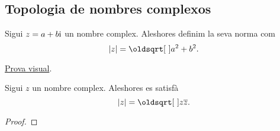 \documentclass[../Apunts.tex]{subfiles}
\begin{document}
	\subsection{Topologia de nombres complexos}
	\begin{definition}
		\label{def:norma d'un nombre complex}
		Sigui \(z=a+b\mathrm{i}\) un nombre complex. Aleshores definim la seva norma com
		\[\norma{z}=\sqrt{a^{2}+b^{2}}.\]
	\end{definition}
	\begin{proposition}
		\href{http://chistemat.es/wp-content/uploads/2013/11/contra-la-desigualdad.png}{Prova visual}.
	\end{proposition}
	\begin{proposition}
		\label{prop:la nomra d'un nombre complex és l'arrel del nombre pel seu conjugat}
		Sigui \(z\) un nombre complex. Aleshores es satisfà
		\[\norma{z}=\sqrt{z\conjugat{z}}.\]
		\begin{proof}
		\end{proof}
	\end{proposition}
	
\end{document}
